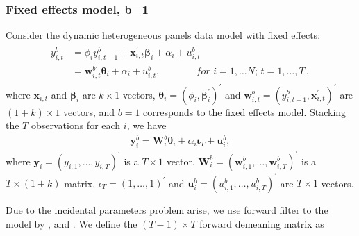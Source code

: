 \documentclass[12pt,a4paper,hyperref]{article}
\begin{document}
\subsubsection{Fixed effects model, b=1}
Consider the dynamic heterogeneous panels data model with fixed effects:
\begin{align}
\begin{split}
y^{b}_{i,t}&=\phi_{i} y^{b}_{i,t-1}+ \boldsymbol{x}^{'}_{i,t}\boldsymbol{\beta}_{i}+\alpha_{i}+u^{b}_{i,t}  \\
&= \boldsymbol{w}^{b'}_{i,t}\boldsymbol{\theta}_{i}+ \alpha_{i}+u^{b}_{i,t}, \,\,\,\, \,\, \,\, \,\,\,\, \,\,\,\, \,\,\,\, \,\, for\,\,i=1,\ldots N;\,t=1,\ldots,T\, , \label{1}
\end{split}
\end{align}
where $\boldsymbol{x}_{i,t}$ and $\boldsymbol{\beta}_{i}$ are $k \times 1$ vectors, $\boldsymbol{\theta}_{i}=\left(\phi_{i}, \boldsymbol{\beta}^{'}_{i} \right)^{'}$ and $\boldsymbol{w}^{b}_{i,t}=\left(y^{b}_{i,t-1}, \boldsymbol{x}^{'}_{i,t} \right)^{'}$ are $\left(1+k\right) \times 1$ vectors, and $b=1$ corresponds to the fixed effects model.
Stacking the $T$ observations for each $i$, we have
\begin{align}
\boldsymbol{y}^{b}_{i}=\boldsymbol{W}^{b}_{i}\boldsymbol{\theta}_{i}+ \alpha_{i}\boldsymbol{\iota}_{T}+ \boldsymbol{u}^{b}_{i}, \label{2}
\end{align}
where $\boldsymbol{y}_{i}=\left(y_{i,1},\ldots, y_{i,T} \right)^{'}$ is a $T \times 1$ vector, $\boldsymbol{W}^{b}_{i}=\left(\boldsymbol{w}^{b}_{i,1},\ldots, \boldsymbol{w}^{b}_{i,T} \right)^{'}$ is a $T \times (1+k)$ matrix, $\iota_{T}=\left(1,\ldots,1 \right)^{'}$ and $\boldsymbol{u}^{b}_{i}=\left(u^{b}_{i,1}, \ldots, u^{b}_{i,T} \right)^{'}$ are $T \times 1$ vectors.

Due to the incidental parameters problem arise, we use forward filter to the model by \citet{Moon:2000}, \citet{Hayakawa:2009} and \citet{Hayakawa:2019}. We define the $\left(T-1 \right) \times T$ forward demeaning matrix as
\end{document}
